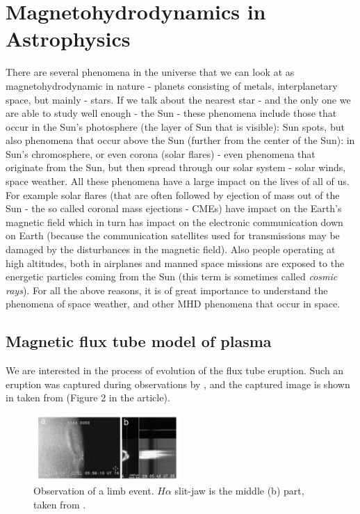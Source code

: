 \section{Magnetohydrodynamics in Astrophysics}
There are several phenomena in the universe that we can look at as magnetohydrodynamic in nature - planets consisting of metals, interplanetary space, but mainly - stars. If we talk about the nearest star - and the only one we are able to study well enough - the Sun - these phenomena include those that occur in the Sun's photosphere (the layer of Sun that is visible): Sun spots, but also phenomena that occur above the Sun (further from the center of the Sun): in Sun's chromosphere, or even corona (solar flares) - even phenomena that originate from the Sun, but then spread through our solar system - solar winds, space weather. All these phenomena have a large impact on the lives of all of us. For example solar flares (that are often followed by ejection of mass out of the Sun - the so called coronal mass ejections - CMEs) have impact on the Earth's magnetic field which in turn has impact on the electronic communication down on Earth (because the communication satellites used for transmissions may be damaged by the disturbances in the magnetic field). Also people operating at high altitudes, both in airplanes and manned space missions are exposed to the energetic particles coming from the Sun (this term is sometimes called \textit{cosmic rays}). For all the above reasons, it is of great importance to understand the phenomena of space weather, and other MHD phenomena that occur in space.

\subsection{Magnetic flux tube model of plasma}
We are interested in the process of evolution of the flux tube eruption. Such an eruption was captured during observations by \cite{miraClanek}, and the captured image is shown in  taken from \cite{miraClanek} (Figure 2 in the article).

\begin{figure}[H]
	\begin{center}
		\includegraphics[width=0.5\textwidth]{img/td-setup/figure2fromHalpha.jpg}
	\caption{Observation of a limb event. $H\alpha$ slit-jaw is the middle (b) part, taken from \cite{miraClanek}.}
	\label{figure:observation}
	\end{center}
\end{figure}

